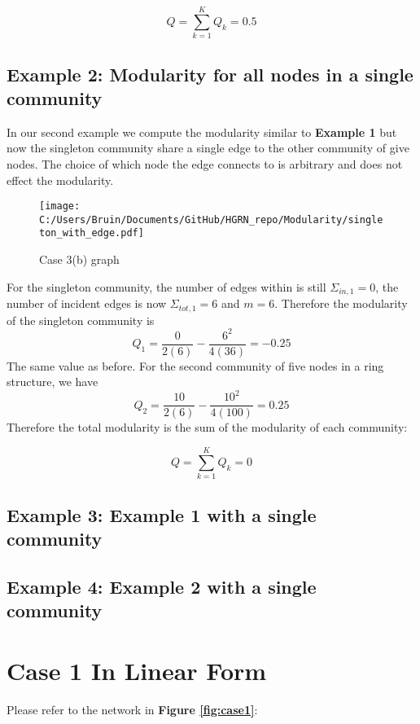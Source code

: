 \documentclass[a4paper,12pt]{article}
\begin{document}
	\[ Q = \sum_{k=1}^K Q_k = 0.5\]
	\subsection*{Example 2: Modularity for all nodes in a single community}
	In our second example we compute the modularity similar to \textbf{Example 1} but now the singleton community share a single edge to the other community of give nodes. The choice of which node the edge connects to is arbitrary and does not effect the modularity.  
	
	\begin{figure}[H]
		\centering
		\caption{Case 3(b) graph}
		\texttt{[image: C:/Users/Bruin/Documents/GitHub/HGRN\_repo/Modularity/singleton\_with\_edge.pdf]}
		\label{fig:case3b}
	\end{figure}
	
	For the singleton community, the number of edges within is still $\Sigma_{in,1} = 0$, the number of incident edges is now $\Sigma_{tot,1} = 6$ and $m = 6$. Therefore the modularity of the singleton community is 
	\[Q_1 = \frac{0}{2(6)} - \frac{6^2}{4(36)} = -0.25\]
	The same value as before. For the second community of five nodes in a ring structure, we have 
	\[Q_2 = \frac{10}{2(6)} - \frac{10^2}{4(100)} = 0.25\]
	Therefore the total modularity is the sum of the modularity of each community:
	
	\[ Q = \sum_{k=1}^K Q_k = 0\]
	
	\subsection*{Example 3: Example 1 with a single community}
	
	\subsection*{Example 4: Example 2 with a single community}
	
	
	
	
	
	\appendix
	
	\section*{Case 1 In Linear Form}
	Please refer to the network in \textbf{Figure \ref{fig:case1}}:
	
\end{document}
